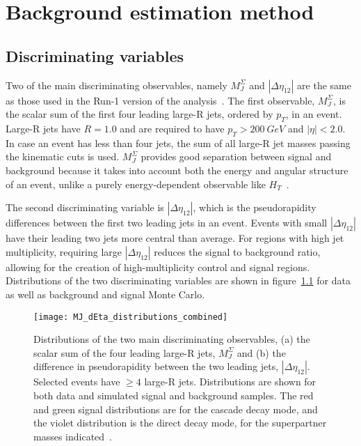 \chapter{Background estimation method}\label{ch:background_method}

\section{Discriminating variables}\label{sec:variables}
Two of the main discriminating observables, namely $M_J^{\Sigma}$ and $|\Delta\eta_{12}|$ are the same as those used in the Run-1 version of the analysis~\cite{run1-multijet}.
The first observable, $M_J^{\Sigma}$, is the scalar sum of the first four leading large-R jets, ordered by $p_{T}$, in an event.
Large-R jets have $R=1.0$ and are required to have $p_{T} > 200~GeV$ and $|\eta|<2.0$.
In case an event has less than four jets, the sum of all large-R jet masses passing the kinematic cuts is used.
$M_{J}^{\Sigma}$ provides good separation between signal and background because it takes into account both the energy and angular structure of an event, unlike a purely energy-dependent observable like $H_{T}$~\cite{hook-mj,elhedri-mj}.

The second discriminating variable is $|\Delta \eta_{12}|$, which is the pseudorapidity differences between the first two leading jets in an event.
Events with small $|\Delta \eta_{12}|$ have their leading two jets more central than average.
For regions with high jet multiplicity, requiring large $|\Delta \eta_{12}|$ reduces the signal to background ratio, allowing for the creation of high-multiplicity control and signal regions.
Distributions of the two discriminating variables are shown in figure~\ref{fig:MJ_dEta_distributions} for data as well as background and signal Monte Carlo.

\begin{figure}[!ht]
    \centering
    \texttt{[image: MJ\_dEta\_distributions\_combined]}
    \caption{Distributions of the two main discriminating observables, (a) the scalar sum of the four leading large-R jets, $M_{J}^{\Sigma}$ and (b) the difference in pseudorapidity between the two leading jets, $|\Delta\eta_{12}|$.
    Selected events have $\geq 4$ large-R jets.
    Distributions are shown for both data and simulated signal and background samples.
    The red and green signal distributions are for the cascade decay mode, and the violet distribution is the direct decay mode, for the superpartner masses indicated~\cite{paper-plb}.}
    \label{fig:MJ_dEta_distributions}
\end{figure}

